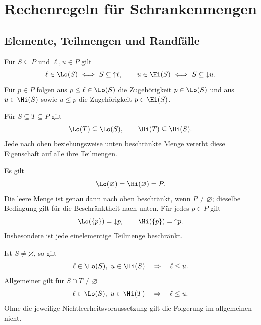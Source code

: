 \chapter{Rechenregeln für Schrankenmengen}
\label{b13guide:ch:bounds}

\section{Elemente, Teilmengen und Randfälle}

\begin{theorem}
Für $S\subseteq P$ und $\ell,u\in P$ gilt
\[
 \ell\in\Lo(S)\ \Longleftrightarrow\ S\subseteq\mathord\uparrow\ell,
 \qquad
 u\in\Hi(S)\ \Longleftrightarrow\ S\subseteq\mathord\downarrow u.
\]
Für $p\in P$ folgen aus $p\leq\ell\in\Lo(S)$ die Zugehörigkeit
$p\in\Lo(S)$ und aus $u\in\Hi(S)$ sowie $u\leq p$ die
Zugehörigkeit $p\in\Hi(S)$.
\end{theorem}

\begin{theorem}\label{b13guide:thm:antitone}
Für $S\subseteq T\subseteq P$ gilt
\[
 \Lo(T)\subseteq\Lo(S),\qquad \Hi(T)\subseteq\Hi(S).
\]
Jede nach oben beziehungsweise unten beschränkte Menge vererbt
diese Eigenschaft auf alle ihre Teilmengen.
\end{theorem}

\begin{theorem}
\label{b13guide:thm:empty-bounds}
Es gilt
\[
 \Lo(\varnothing)=\Hi(\varnothing)=P.
\]
Die leere Menge ist genau dann nach oben beschränkt, wenn $P\ne\varnothing$;
dieselbe Bedingung gilt für die Beschränktheit nach unten.
Für jedes $p\in P$ gilt
\[
 \Lo(\{p\})=\mathord\downarrow p,\qquad
 \Hi(\{p\})=\mathord\uparrow p.
\]
Insbesondere ist jede einelementige Teilmenge beschränkt.
\end{theorem}

\begin{theorem}
\label{b13guide:thm:cross-bounds}
Ist $S\ne\varnothing$, so gilt
\[
 \ell\in\Lo(S),\ u\in\Hi(S)\quad\Rightarrow\quad\ell\leq u.
\]
Allgemeiner gilt für $S\cap T\ne\varnothing$
\[
 \ell\in\Lo(S),\ u\in\Hi(T)\quad\Rightarrow\quad\ell\leq u.
\]
Ohne die jeweilige Nichtleerheitsvoraussetzung gilt die Folgerung
im allgemeinen nicht.
\end{theorem}



